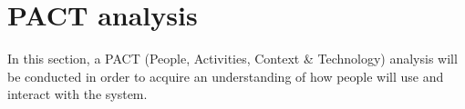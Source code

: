 \section{PACT analysis}
In this section, a PACT (People, Activities, Context \& Technology) analysis will be conducted in order to acquire an understanding of how people will use and interact with the system.